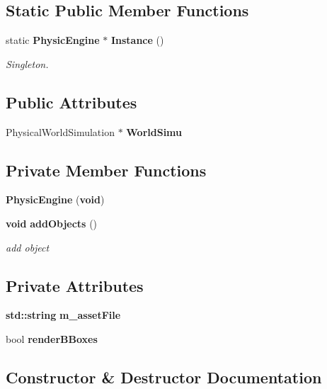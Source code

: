 \subsection*{Static Public Member Functions}
\begin{DoxyCompactItemize}
\item 
static {\bf Physic\+Engine} $\ast$ {\bf Instance} ()
\begin{DoxyCompactList}\small\item\em Singleton. \end{DoxyCompactList}\end{DoxyCompactItemize}
\subsection*{Public Attributes}
\begin{DoxyCompactItemize}
\item 
Physical\+World\+Simulation $\ast$ {\bf World\+Simu}
\end{DoxyCompactItemize}
\subsection*{Private Member Functions}
\begin{DoxyCompactItemize}
\item 
{\bf Physic\+Engine} ({\bf void})
\item 
{\bf void} {\bf add\+Objects} ()
\begin{DoxyCompactList}\small\item\em add object \end{DoxyCompactList}\end{DoxyCompactItemize}
\subsection*{Private Attributes}
\begin{DoxyCompactItemize}
\item 
{\bf std\+::string} {\bf m\+\_\+asset\+File}
\item 
bool {\bf render\+B\+Boxes}
\end{DoxyCompactItemize}


\subsection{Constructor \& Destructor Documentation}
